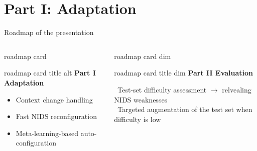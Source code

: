 \section{Part I: Adaptation}

\begin{frame}{Roadmap of the presentation}
	\small


	\centering
	\vspace*{0.2em}

	\begin{columns}[T,onlytextwidth]
		\begin{beamercolorbox}[wd=\linewidth,sep=0pt,rounded=true]{roadmap card}
			\begin{beamercolorbox}[wd=\linewidth,sep=1ex,rounded=true]{roadmap card title alt}
				\centering \textbf{Part I \quad Adaptation}
			\end{beamercolorbox}
			\begin{minipage}[t][4.2cm][t]{\linewidth}
				\vspace*{0.05cm}
				\raggedright
				\hspace*{0.03\linewidth}\parbox{0.94\linewidth}{%
					\footnotesize
					\begin{itemize}
						\setlength\itemsep{0.45em}
						\item Context change handling
						\item Fast NIDS reconfiguration
						\item Meta-learning-based auto-configuration
					\end{itemize}}
			\end{minipage}
		\end{beamercolorbox}

		\begin{beamercolorbox}[wd=\linewidth,sep=0pt,rounded=true]{roadmap card dim}
			\begin{beamercolorbox}[wd=\linewidth,sep=1ex,rounded=true]{roadmap card title dim}
				\centering \textbf{Part II \quad Evaluation}
			\end{beamercolorbox}
			\begin{minipage}[t][4.2cm][t]{\linewidth}
				\vspace*{0.05cm}
				\raggedright
				\hspace*{0.03\linewidth}\parbox{0.94\linewidth}{%
					\footnotesize\color{black!35}
					\textbullet\ Test-set difficulty assessment \(\rightarrow\) relvealing NIDS weaknesses\\[0.45em]
					\textbullet\ Targeted augmentation of the test set when difficulty is low}
			\end{minipage}
		\end{beamercolorbox}
	\end{columns}


\end{frame}
